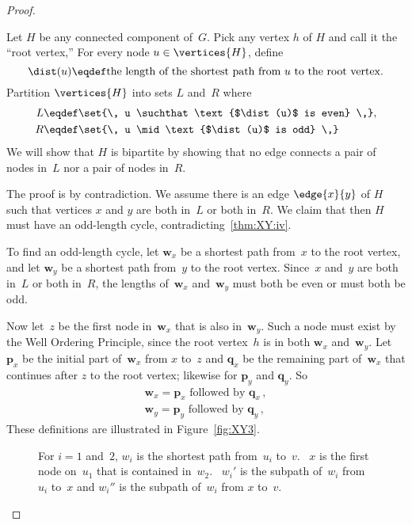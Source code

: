 \begin{editingnotes}
\begin{proof}
\begin{description}
Let $H$ be any connected component of~$G$.  Pick any vertex $h$ of $H$
and call it the ``root vertex,''  For every node $u \in \vertices{H}$,
define
\[
\dist(u)  \eqdef \text{the length of the shortest path from $u$ to
        the root vertex.}
\]
Partition $\vertices{H}$ into sets $L$ and~$R$ where
\begin{align*}
    L &\eqdef \set{\, u \suchthat \text{$\dist(u)$ is even} \,}, \\
    R &\eqdef \set{\, u \mid \text{$\dist(u)$ is odd} \,}
\end{align*}
We will show that $H$ is bipartite by showing that no edge connects a
pair of nodes in~$L$ nor a pair of nodes in~$R$.

The proof is by contradiction.  We assume there is an edge
$\edge{x}{y}$ of $H$ such that vertices $x$ and $y$ are both in~$L$ or
both in~$R$.  We claim that then $H$ must have an odd-length cycle,
contradicting~\ref{thm:XY:iv}.

To find an odd-length cycle, let $\mathbf{w}_x$ be a shortest path
from~$x$ to the root vertex, and let $\mathbf{w}_y$ be a shortest path
from~$y$ to the root vertex.  Since~$x$ and~$y$ are both in~$L$ or
both in~$R$, the lengths of~$\mathbf{w}_x$ and~$\mathbf{w}_y$ must
both be even or must both be odd.

Now let~$z$ be the first node in~$\mathbf{w}_x$ that is also
in~$\mathbf{w}_y$.  Such a node must exist by the Well Ordering
Principle, since the root vertex~$h$ is in both $\mathbf{w}_x$
and~$\mathbf{w}_y$.  Let $\mathbf{p}_x$ be the initial part
of~$\mathbf{w}_x$ from $x$ to~$z$ and $\mathbf{q}_x$ be the remaining
part of~$\mathbf{w}_x$ that continues after $z$ to the root vertex;
likewise for $\mathbf{p}_y$ and $\mathbf{q}_y$.  So
\begin{align}
\mathbf{w}_x = \mathbf{p}_x \text{ followed by } \mathbf{q}_x\, ,\label{wxpxqx}\\
\mathbf{w}_y = \mathbf{p}_y \text{ followed by } \mathbf{q}_y\, ,\label{wypyqy}
\end{align}
These definitions are illustrated in Figure~\ref{fig:XY3}.

\begin{figure}



\caption{For $i = 1$ and~$2$, $w_i$ is the shortest path from~$u_i$
  to~$v$.  \ $x$ is the first node on~$u_1$ that is contained
  in~$w_2$. \ $w_i'$ is the subpath of~$w_i$ from $u_i$ to~$x$ and
  $w_i''$ is the subpath of~$w_i$ from $x$ to~$v$.}


\end{figure}
\end{description}
\end{proof}
\end{editingnotes}
